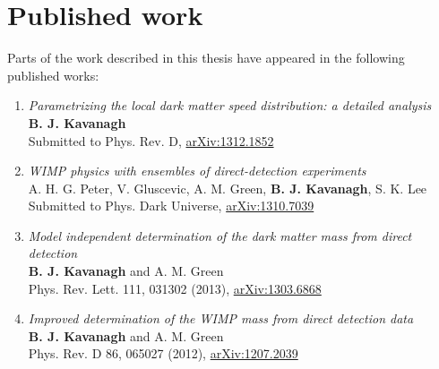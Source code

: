 \chapter*{Published work}

Parts of the work described in this thesis have appeared in the following published works:

\begin{SingleSpace}

  \begin{enumerate}
    \item \textit{Parametrizing the local dark matter speed distribution: a detailed analysis}\\
    \textbf{B. J. Kavanagh}\\
    Submitted to Phys. Rev. D, \href{http://arxiv.org/abs/1312.1852}{arXiv:1312.1852}

    \item \textit{WIMP physics with ensembles of direct-detection experiments}\\
    A. H. G. Peter, V. Gluscevic, A. M. Green, \textbf{B. J. Kavanagh}, S. K. Lee\\
    Submitted to Phys. Dark Universe, \href{http://arxiv.org/abs/1310.7039}{arXiv:1310.7039}

    \item \textit{Model independent determination of the dark matter mass from direct detection}\\
    \textbf{B. J. Kavanagh} and A. M. Green\\
    Phys. Rev. Lett. 111, 031302 (2013), \href{http://arxiv.org/abs/1303.6868}{arXiv:1303.6868}\\

    \item \textit{Improved determination of the WIMP mass from direct detection data}\\
    \textbf{B. J. Kavanagh} and A. M. Green \\
    Phys. Rev. D 86, 065027 (2012), \href{http://arxiv.org/abs/1207.2039}{arXiv:1207.2039}
  \end{enumerate}

\end{SingleSpace}


